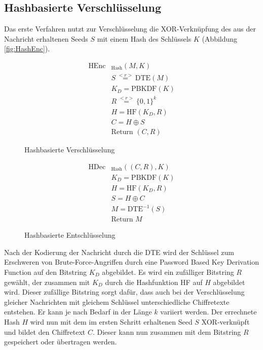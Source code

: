 \subsection{Hashbasierte Verschlüsselung}

Das erste Verfahren nutzt zur Verschlüsselung die XOR-Verknüpfung des aus der Nachricht erhaltenen Seeds \(S\) mit einem Hash des Schlüssels \(K\) (Abbildung \ref{fig:HashEnc}).  

\begin{figure}[h]
	\begin{minipage}[b]{0.5\textwidth}
		\begin{align*}
			\text{HEnc}&_{\text{Hash}}(M, K)\\
			&S \overset{<r>}{=} \text{DTE}(M)\\ 	%
			&K_D = \text{PBKDF}(K)\\ 		%
			&R \overset{<r>}{=} \{0,1\}^k\\	%
			&H = \text{HF}(K_D,R)\\	%
			&C = H \oplus S\\	%
			&\text{Return } (C,R)
		\end{align*}
		\caption{Hashbasierte Verschlüsselung}
		\label{fig:HashEnc}
	\end{minipage}
	\begin{minipage}[b]{0.5\textwidth}
		\begin{align*}
			\text{HDec}&_{\text{Hash}}((C,R), K)\\
			&K_D = \text{PBKDF}(K)\\ 		%
			&H = \text{HF}(K_D,R)\\	%
			&S = H \oplus C\\	%
			&M = \text{DTE}^{-1}(S)\\ 	%
			&\text{Return } M
		\end{align*}
		\caption{Hashbasierte Entschlüsselung}
		\label{fig:HashDec}
	\end{minipage}
\end{figure}

Nach der Kodierung der Nachricht durch die DTE wird der Schlüssel zum Erschweren von Brute-Force-Angriffen durch eine Password Based Key Derivation Function auf den Bitstring \(K_D\) abgebildet. Es wird ein zufälliger Bitstring \(R\) gewählt, der zusammen mit \(K_D\) durch die Hashfunktion HF auf \(H\) abgebildet wird. Dieser zufällige Bitstring sorgt dafür, dass auch bei der Verschlüsselung gleicher Nachrichten mit gleichem Schlüssel unterschiedliche Chiffretexte entstehen. Er kann je nach Bedarf in der Länge \(k\) variiert werden. Der errechnete Hash \(H\) wird nun mit dem im ersten Schritt erhaltenen Seed \(S\) XOR-verknüpft und bildet den Chiffretext \(C\). Dieser kann nun zusammen mit dem Bitstring \(R\) gespeichert oder übertragen werden. 

